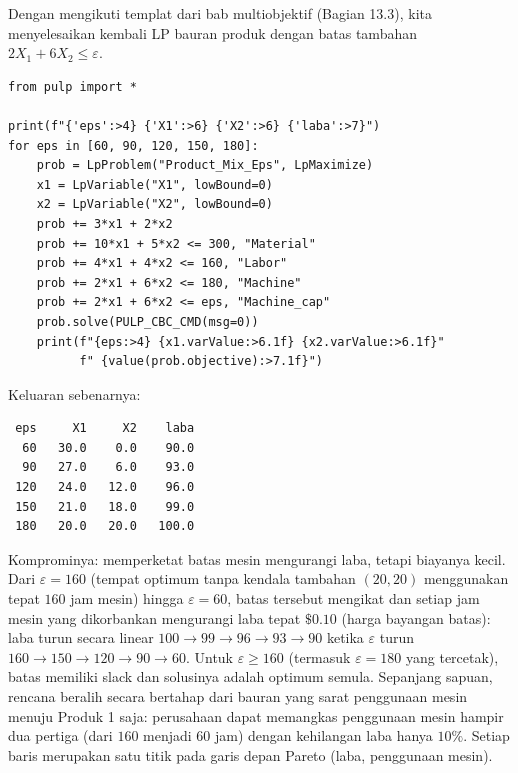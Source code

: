 
Dengan mengikuti templat dari bab multiobjektif (Bagian 13.3), kita
menyelesaikan kembali LP bauran produk dengan batas tambahan
$2X_1 + 6X_2 \leq \varepsilon$.

\begin{verbatim}
from pulp import *

print(f"{'eps':>4} {'X1':>6} {'X2':>6} {'laba':>7}")
for eps in [60, 90, 120, 150, 180]:
    prob = LpProblem("Product_Mix_Eps", LpMaximize)
    x1 = LpVariable("X1", lowBound=0)
    x2 = LpVariable("X2", lowBound=0)
    prob += 3*x1 + 2*x2
    prob += 10*x1 + 5*x2 <= 300, "Material"
    prob += 4*x1 + 4*x2 <= 160, "Labor"
    prob += 2*x1 + 6*x2 <= 180, "Machine"
    prob += 2*x1 + 6*x2 <= eps, "Machine_cap"
    prob.solve(PULP_CBC_CMD(msg=0))
    print(f"{eps:>4} {x1.varValue:>6.1f} {x2.varValue:>6.1f}"
          f" {value(prob.objective):>7.1f}")
\end{verbatim}

Keluaran sebenarnya:

\begin{verbatim}
 eps     X1     X2    laba
  60   30.0    0.0    90.0
  90   27.0    6.0    93.0
 120   24.0   12.0    96.0
 150   21.0   18.0    99.0
 180   20.0   20.0   100.0
\end{verbatim}

Komprominya: memperketat batas mesin mengurangi laba, tetapi biayanya kecil.
Dari $\varepsilon = 160$ (tempat optimum tanpa kendala tambahan $(20,20)$
menggunakan tepat $160$ jam mesin) hingga $\varepsilon = 60$, batas tersebut
mengikat dan setiap jam mesin yang dikorbankan mengurangi laba tepat
$\$0.10$ (harga bayangan batas): laba turun secara linear
$100 \to 99 \to 96 \to 93 \to 90$ ketika $\varepsilon$ turun
$160 \to 150 \to 120 \to 90 \to 60$. Untuk $\varepsilon \geq 160$
(termasuk $\varepsilon = 180$ yang tercetak), batas memiliki slack dan
solusinya adalah optimum semula. Sepanjang sapuan, rencana beralih secara
bertahap dari bauran yang sarat penggunaan mesin menuju Produk 1 saja:
perusahaan dapat memangkas penggunaan mesin hampir dua pertiga (dari $160$
menjadi $60$ jam) dengan kehilangan laba hanya $10\%$. Setiap baris merupakan
satu titik pada garis depan Pareto (laba, penggunaan mesin).


